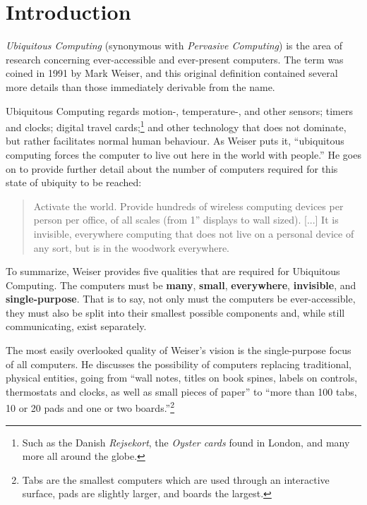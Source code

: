 \section{Introduction}

\emph{Ubiquitous Computing} (synonymous with \emph{Pervasive Computing}) is the area of research concerning
ever-accessible and ever-present computers. The term was coined in 1991 by Mark Weiser, and this original
definition contained several more details than those immediately derivable from the name.

Ubiquitous Computing regards motion-, temperature-, and other sensors; timers and clocks; digital travel
cards;\footnote{Such as the Danish \emph{Rejsekort}, the \emph{Oyster cards} found in London, and many more
all around the globe.} and other technology that does not dominate, but rather facilitates normal human
behaviour. As Weiser puts it, ``ubiquitous computing forces the computer to live out here in the world with
people.''\cite{weiseronline} He goes on to provide further detail about the number of computers required for
this state of ubiquity to be reached:

\begin{quote}
     Activate the world. Provide hundreds of wireless computing devices per person per
     office, of all scales (from 1'' displays to wall sized). [...] It is invisible, everywhere computing that does
     not live on a personal device of any sort, but is in the woodwork everywhere.\cite{weiseronline}
\end{quote}

To summarize, Weiser provides five qualities that are required for Ubiquitous Computing. The computers must be
\textbf{many}, \textbf{small}, \textbf{everywhere}, \textbf{invisible}, and \textbf{single-purpose}. That is to say,
not only must the computers be ever-accessible, they must also be split into their smallest possible components and,
while still communicating, exist separately.

The most easily overlooked quality of Weiser's vision is the single-purpose focus of all computers. He discusses
the possibility of computers replacing traditional, physical entities, going from ``wall notes, titles on book spines,
labels on controls, thermostats and clocks, as well as small pieces of paper'' to ``more than 100 tabs, 10 or 20 pads
and one or two boards.''\footnote{Tabs are the smallest computers which are used through an interactive surface, pads
are slightly larger, and boards the largest.}\cite{weiser91}

